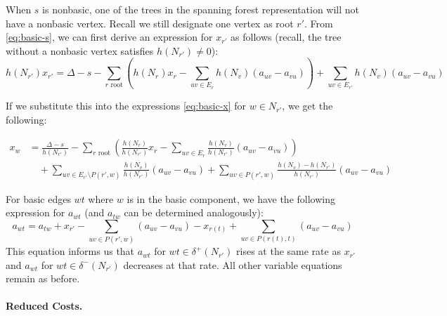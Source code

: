 \documentclass[titlepage,11pt]{article}
\begin{document}
When $s$ is nonbasic, one of the trees in the spanning forest representation will not have a nonbasic vertex. Recall we still designate one vertex as root $r'$. From \eqref{eq:basic-s}, we can first derive an expression for $x_{r'}$ as follows (recall, the tree without a nonbasic vertex satisfies $h(N_{r'}) \ne 0$):
\begin{equation}
    h(N_{r'})x_{r'} = \Delta - s - \sum_{r \text{ root}}\left(h(N_r)x_r - \sum_{uv \in E_r}h(N_v)(a_{uv} - a_{vu})\right)  + \sum_{uv \in E_{r'}} h(N_v)(a_{uv} - a_{vu})
\end{equation}

If we substitute this into the expressions \eqref{eq:basic-x} for $w \in N_{r'}$, we get the following:

\begin{align}
    x_w    &= \frac{\Delta - s}{h(N_{r'})} -\sum_{r \text{ root}}\left(\frac{h(N_r)}{h(N_{r'})}x_r - \sum_{uv \in E_r}\frac{h(N_v)}{h(N_{r'})}(a_{uv} - a_{vu})\right)  \label{eq:basic-x-s}\\
        &\quad+ \sum_{uv \in E_{r'}\setminus P(r',w)} \frac{h(N_v)}{h(N_{r'})}(a_{uv} - a_{vu}) + \sum_{uv \in P(r',w)}\frac{h(N_v)-h(N_{r'})}{h(N_{r'})}(a_{uv} - a_{vu}) \nonumber
\end{align}

For basic edges $wt$ where $w$ is in the basic component, we have the following expression for $a_{wt}$ (and $a_{tw}$ can be determined analogously):
\begin{equation} \label{eq:basic-a-plus-s}
    a_{wt} = a_{tw} + x_{r'} - \sum_{uv \in P(r', w)}(a_{uv}-a_{vu}) - x_{r(t)} + \sum_{uv \in P(r(t), t)}(a_{uv} - a_{vu})
\end{equation}
This equation informs us that $a_{wt}$ for $wt \in \delta^+(N_{r'})$ rises at the same rate as $x_{r'}$ and $a_{wt}$ for $wt \in \delta^-(N_{r'})$ decreases at that rate.
All other variable equations remain as before.

\paragraph{Reduced Costs.}
\end{document}
